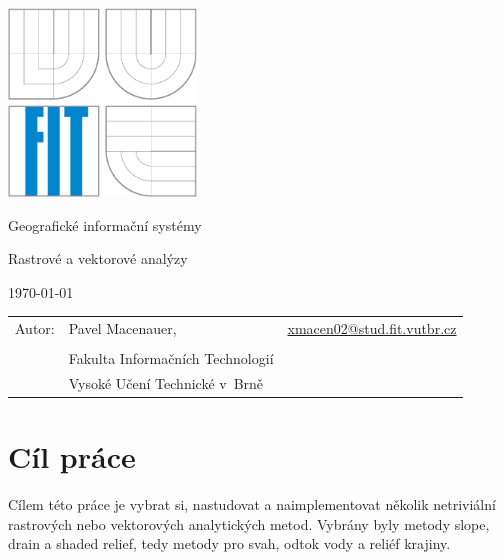 \documentclass[12pt,a4paper,titlepage,final]{report}
\makeatletter
\newcommand\Course{Geografické informační systémy}
\newcommand\WorkTitle{Rastrové a vektorové analýzy}
\newcommand\AuthorA{Pavel Macenauer}
\newcommand\AuthorAEmail{xmacen02@stud.fit.vutbr.cz}
\newcommand\Faculty{Fakulta Informačních Technologií}
\newcommand\School{Vysoké Učení Technické v~Brně}
\makeatother
\begin{document}
	\begin{titlepage}
	\begin{center}
		\includegraphics[height=5cm]{images/logo.eps}
	\end{center}
	\vfill
	\begin{center}
		\begin{Large}
			\Course\\
		\end{Large}
		\bigskip
		\begin{Huge}
			\WorkTitle\\
		\end{Huge}
	\end{center}
	\vfill
	\begin{center}
		\begin{large}
			\today
		\end{large}
	\end{center}
	\vfill
	\begin{flushleft}
		\begin{large}
			\begin{tabular}{lll}
				Autor: & \AuthorA, & \url{\AuthorAEmail} \\
		
				& & \\
				& \Faculty \\
				& \School \\
			\end{tabular}
		\end{large}
	\end{flushleft}
\end{titlepage}		

\tableofcontents

\newpage

\section{Cíl práce}

Cílem této práce je vybrat si, nastudovat a naimplementovat několik netriviální rastrových nebo vektorových analytických metod. Vybrány byly metody slope, drain a shaded relief, tedy metody pro svah, odtok vody a reliéf krajiny.
\end{document}
